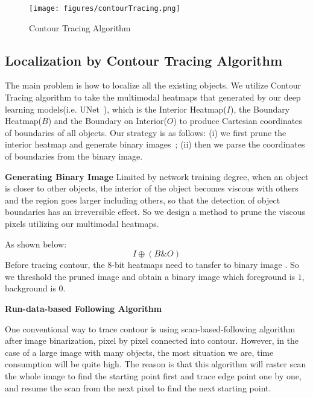 \documentclass{article}
\begin{document}
{\begin{figure*}[!ht]
  \centering
     \texttt{[image: figures/contourTracing.png]}\label{fig:contour_tracing}
  \caption{Contour Tracing Algorithm}
  \end{figure*}


\subsection{Localization by Contour Tracing Algorithm\label{sec:contour_finding}}
The main problem is how to localize all the existing objects. 
We utilize Contour Tracing algorithm to take the multimodal heatmaps that generated by our deep learning models(i.e. UNet~\cite{ronneberger2015u}), which is the Interior Heatmap($I$), the Boundary Heatmap($B$) and the Boundary on Interior($O$) to produce Cartesian coordinates of boundaries of all objects. Our strategy is as follows: (i) we first prune the interior heatmap and generate binary images~\cite{suzuki1985topological}; (ii) then we parse the coordinates of boundaries from the binary image.

\textbf{Generating Binary Image}
Limited by network training degree, when an object is closer to other objects, the interior of the object becomes viscous with others and the region goes larger including others,
so that the detection of object boundaries has an irreversible effect.
So we design a method to prune the viscous pixels utilizing our multimodal heatmaps.

As shown below:
\begin{equation}
  I \oplus (B \& O)  
\end{equation}
Before tracing contour, the 8-bit heatmaps need to tansfer to binary image \cite{suzuki1985topological}.
So we threshold the pruned image and obtain a binary image which foreground is $1$, background is $0$.



\textbf{Run-data-based Following Algorithm}

One conventional way to trace contour is using scan-based-following algorithm after image binarization, pixel by pixel connected into contour\cite{suzuki1985topological}.
However, in the case of a large image with many objects, the most situation we are, time consumption will be quite high\cite{s16030353}.
The reason is that this algorithm will raster scan the whole image to find the starting 
point first and trace edge point one by one, and resume the scan from the next pixel to find 
the next starting point.

}
\end{document}
